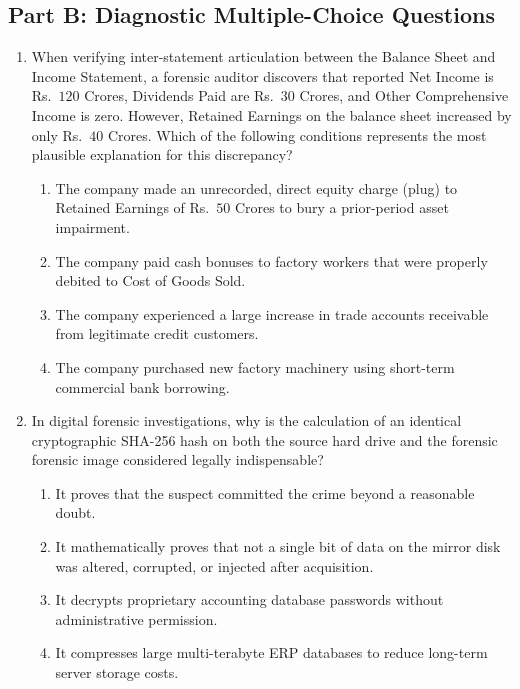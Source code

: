 \subsection*{Part B: Diagnostic Multiple-Choice Questions}

\begin{enumerate}[label=\textbf{MCQ 4.\arabic*}]
    \item When verifying inter-statement articulation between the Balance Sheet and Income Statement, a forensic auditor discovers that reported Net Income is Rs.~$120$ Crores, Dividends Paid are Rs.~$30$ Crores, and Other Comprehensive Income is zero. However, Retained Earnings on the balance sheet increased by only Rs.~$40$ Crores. Which of the following conditions represents the most plausible explanation for this discrepancy?
    \begin{enumerate}[label=(\alph*)]
        \item The company made an unrecorded, direct equity charge (plug) to Retained Earnings of Rs.~$50$ Crores to bury a prior-period asset impairment.
        \item The company paid cash bonuses to factory workers that were properly debited to Cost of Goods Sold.
        \item The company experienced a large increase in trade accounts receivable from legitimate credit customers.
        \item The company purchased new factory machinery using short-term commercial bank borrowing.
    \end{enumerate}

    \item In digital forensic investigations, why is the calculation of an identical cryptographic SHA-256 hash on both the source hard drive and the forensic forensic image considered legally indispensable?
    \begin{enumerate}[label=(\alph*)]
        \item It proves that the suspect committed the crime beyond a reasonable doubt.
        \item It mathematically proves that not a single bit of data on the mirror disk was altered, corrupted, or injected after acquisition.
        \item It decrypts proprietary accounting database passwords without administrative permission.
        \item It compresses large multi-terabyte ERP databases to reduce long-term server storage costs.
    \end{enumerate}
\end{enumerate}
